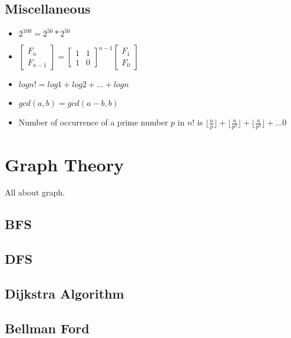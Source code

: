 \documentclass[10pt, a4paper]{article}
\begin{document}
\begin{multicols}{2}
\subsection{Miscellaneous}
\begin{itemize}
	\item \(2^{100} = 2^{50} * 2^{50}\)
	\item \( 
        \begin{bmatrix}
            F_n\\
            F_{n-1}
        \end{bmatrix} = 
        \begin{bmatrix}
            1 & 1\\
            1 & 0
        \end{bmatrix} ^ {n-1}
        \begin{bmatrix}
            F_1\\
            F_0
        \end{bmatrix}
    \)
    \item \(
        logn! = log1 +log2+...+logn
    \)
    \item \(
    	gcd(a, b) = gcd(a-b, b)
    \)
    \item Number of occurrence of a prime number $p$ in $n!$ is \(
    	\lfloor \frac{n}{p} \rfloor +	
    	\lfloor \frac{n}{p^2} \rfloor + 
    	\lfloor \frac{n}{p^3} \rfloor + ... 0
    \)
\end{itemize}

\section{Graph Theory}
All about graph.

\subsection{BFS}


\subsection{DFS}


\subsection{Dijkstra Algorithm}


\subsection{Bellman Ford}



\end{multicols}
\end{document}
